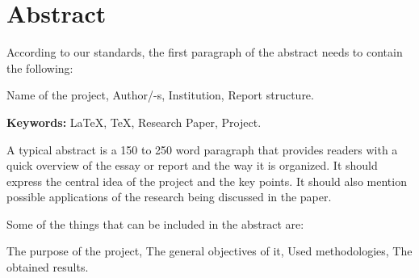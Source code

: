 \chapter*{Abstract}

According to our standards, the first paragraph of the abstract needs to contain the following:

\begin{itemize}
    \hitem Name of the project,
    \hitem Author/-s,
    \hitem Institution,
    \hitem Report structure.
\end{itemize}

\textbf{Keywords: } \LaTeX, \TeX, Research Paper, Project.

A typical abstract is a 150 to 250 word paragraph that provides readers with a quick overview of the essay or report and the way it is organized. 
It should express the central idea of the project and the key points. It should also mention possible applications of the research being discussed in the paper.

Some of the things that can be included in the abstract are:

\begin{itemize}
    \hitem The purpose of the project,
    \hitem The general objectives of it,
    \hitem Used methodologies,
    \hitem The obtained results.
\end{itemize}

